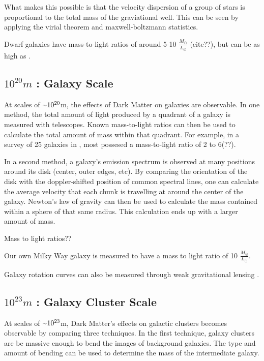 What makes this possible is that the velocity dispersion of a group of stars is proportional to the total mass of the graviational well.
This can be seen by applying the virial theorem and maxwell-boltzmann statistics.

Dwarf galaxies have mass-to-light ratios of around 5-10 $\frac{M_\odot}{L_\odot}$ (cite??), but can be as high as  \cite{Simon2007_dwarfgalaxykeck}.



\subsection{$10^{20}m$ : Galaxy Scale}
%
At scales of $\nicetilde 10^{20}$m, the effects of Dark Matter on galaxies are observable.
In one method, the total amount of light produced by a quadrant of a galaxy is measured with telescopes.
Known mass-to-light ratios can then be used to calculate the total amount of mass within that quadrant.
For example, in a survey of 25 galaxies in \cite{galaxy_mass_light_ratio}, most possesed a mass-to-light ratio of 2 to 6(??).


In a second method, a galaxy's emission spectrum is observed at many positions around its disk (center, outer edges, etc).
By comparing the orientation of the disk with the doppler-shifted position of common spectral lines, one can calculate the average velocity that each chunk is travelling at around the center of the galaxy.
Newton's law of gravity can then be used to calculate the mass contained within a sphere of that same radius.
This calculation ends up with a larger amount of mass.

Mass to light ratios??

Our own Milky Way galaxy is measured to have a mass to light ratio of 10 $\frac{M_{\odot}}{L_{\odot}}$.

Galaxy rotation curves can also be measured through weak gravitational lensing \cite{weak_lensing_2001}.


\subsection{$10^{23}m$ : Galaxy Cluster Scale}
%
At scales of $\nicetilde 10^{23}$m, Dark Matter's effects on galactic clusters becomes observable by comparing three techniques.
In the first technique, galaxy clusters are be massive enough to bend the images of background galaxies.
The type and amount of bending can be used to determine the mass of the intermediate galaxy.

